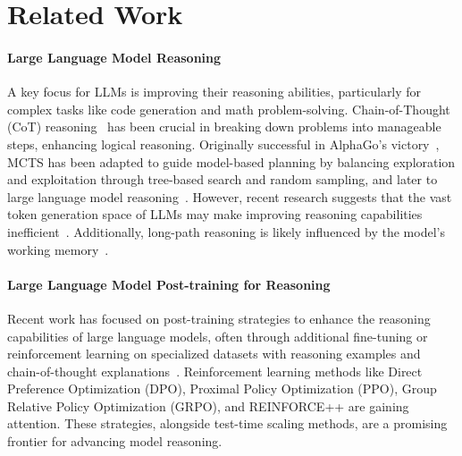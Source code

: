 \section{Related Work}
\paragraph{Large Language Model Reasoning}
A key focus for LLMs is improving their reasoning abilities, particularly for complex tasks like code generation and math problem-solving. Chain-of-Thought (CoT) reasoning~\cite{cot} has been crucial in breaking down problems into manageable steps, enhancing logical reasoning. Originally successful in AlphaGo's victory~\cite{alphazero}, MCTS has been adapted to guide model-based planning by balancing exploration and exploitation through tree-based search and random sampling, and later to large language model reasoning~\cite{sc-mcts, deepprover1.5, xu2023traingainunleashmathematical}.  However, recent research suggests that the vast token generation space of LLMs may make improving reasoning capabilities inefficient~\cite{deepseekai2025deepseekr1incentivizingreasoningcapability}. Additionally, long-path reasoning is likely influenced by the model's working memory~\cite{workingmemory}.


\paragraph{Large Language Model Post-training for Reasoning}
Recent work has focused on post-training strategies to enhance the reasoning capabilities of large language models, often through additional fine-tuning or reinforcement learning on specialized datasets with reasoning examples and chain-of-thought explanations~\cite{xu2025redstardoesscalinglongcot}. Reinforcement learning methods like Direct Preference Optimization (DPO)\cite{dpo}, Proximal Policy Optimization (PPO)\cite{ppo}, Group Relative Policy Optimization (GRPO)\cite{grpo}, and REINFORCE++\cite{rpp} are gaining attention. These strategies, alongside test-time scaling methods, are a promising frontier for advancing model reasoning.

